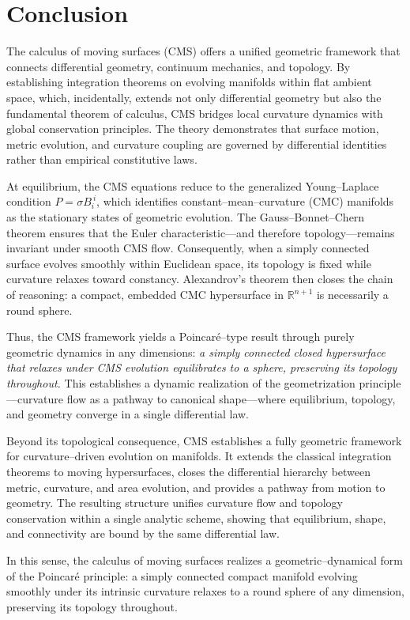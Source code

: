 \documentclass[11pt]{article}
\theoremstyle{definition}
\theoremstyle{plain}
\theoremstyle{remark}
\begin{document}

\section{Conclusion}

The calculus of moving surfaces (CMS) offers a unified geometric framework that connects differential geometry, continuum mechanics, and topology. By establishing integration theorems on evolving manifolds within flat ambient space, which, incidentally, extends not only differential geometry but also the fundamental theorem of calculus, CMS bridges local curvature dynamics with global conservation principles. The theory demonstrates that surface motion, metric evolution, and curvature coupling are governed by differential identities rather than empirical constitutive laws.  

At equilibrium, the CMS equations reduce to the generalized Young–Laplace condition $P=\sigma B_i^{\ i}$, which identifies constant–mean–curvature (CMC) manifolds as the stationary states of geometric evolution.  
The Gauss–Bonnet–Chern theorem ensures that the Euler characteristic—and therefore topology—remains invariant under smooth CMS flow.  
Consequently, when a simply connected surface evolves smoothly within Euclidean space, its topology is fixed while curvature relaxes toward constancy.  
Alexandrov’s theorem then closes the chain of reasoning: a compact, embedded CMC hypersurface in $\mathbb{R}^{n+1}$ is necessarily a round sphere.  

Thus, the CMS framework yields a Poincaré–type result through purely geometric dynamics in any dimensions:  
\emph{a simply connected closed hypersurface that relaxes under CMS evolution equilibrates to a sphere, preserving its topology throughout.}  
This establishes a dynamic realization of the geometrization principle—curvature flow as a pathway to canonical shape—where equilibrium, topology, and geometry converge in a single differential law.  

Beyond its topological consequence, CMS establishes a fully geometric framework for curvature–driven evolution on manifolds.  
It extends the classical integration theorems to moving hypersurfaces, closes the differential hierarchy between metric, curvature, and area evolution, and provides a pathway from motion to geometry.  
The resulting structure unifies curvature flow and topology conservation within a single analytic scheme, showing that equilibrium, shape, and connectivity are bound by the same differential law.  

In this sense, the calculus of moving surfaces realizes a geometric–dynamical form of the Poincaré principle:  a simply connected compact manifold evolving smoothly under its intrinsic curvature relaxes to a round sphere of any dimension, preserving its topology throughout.   




\end{document}
